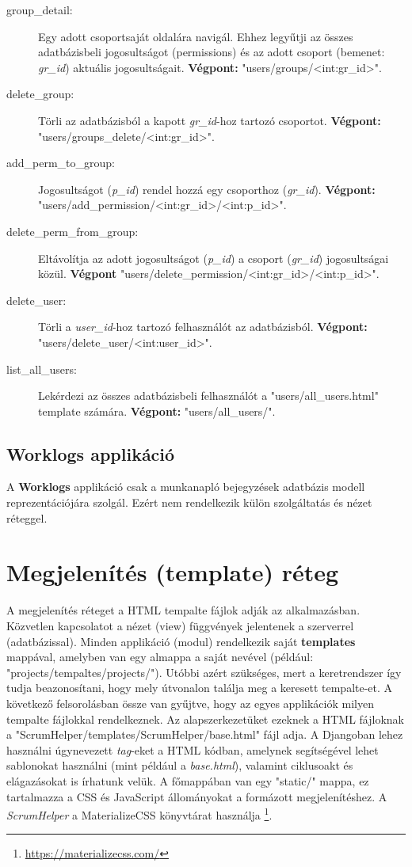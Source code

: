 \begin{itemize}
\begin{description}
		\item[group\_detail:] Egy adott csoportsaját oldalára navigál. Ehhez legyűtji az összes adatbázisbeli jogosultságot (permissions) és az adott csoport (bemenet: \textit{gr\_id}) aktuális jogosultságait. \textbf{Végpont:} "users/groups/<int:gr\_id>".
		\item[delete\_group:] Törli az adatbázisból a kapott \textit{gr\_id}-hoz tartozó csoportot. \textbf{Végpont:} "users/groups\_delete/<int:gr\_id>".
		\item[add\_perm\_to\_group:] Jogosultságot (\textit{p\_id}) rendel hozzá egy csoporthoz (\textit{gr\_id}). \textbf{Végpont:} "users/add\_permission/<int:gr\_id>/<int:p\_id>".
		\item[delete\_perm\_from\_group:] Eltávolítja az adott jogosultságot (\textit{p\_id}) a csoport (\textit{gr\_id}) jogosultságai közül. \textbf{Végpont} "users/delete\_permission/<int:gr\_id>/<int:p\_id>".
		\item[delete\_user:] Törli a \textit{user\_id}-hoz tartozó felhasználót az adatbázisból. \textbf{Végpont:} "users/delete\_user/<int:user\_id>".
		\item[list\_all\_users:] Lekérdezi az összes adatbázisbeli felhasználót a "users/all\_users.html" template számára. \textbf{Végpont:} "users/all\_users/".
	\end{description}
\end{itemize}	

\subsection{Worklogs applikáció}

A \textbf{Worklogs} applikáció csak a munkanapló bejegyzések adatbázis modell reprezentációjára szolgál. Ezért nem rendelkezik külön szolgáltatás és nézet réteggel.

\section{Megjelenítés (template) réteg}

A megjelenítés réteget a HTML tempalte fájlok adják az alkalmazásban. Közvetlen kapcsolatot a nézet (view) függvények jelentenek a szerverrel (adatbázissal). Minden applikáció (modul) rendelkezik saját \textbf{templates} mappával, amelyben van egy almappa a saját nevével (például: "projects/tempaltes/projects/"). Utóbbi azért szükséges, mert a keretrendszer így tudja beazonosítani, hogy mely útvonalon találja meg a keresett tempalte-et. A következő felsorolásban össze van gyűjtve, hogy az egyes applikációk milyen tempalte fájlokkal rendelkeznek. Az alapszerkezetüket ezeknek a HTML fájloknak a "ScrumHelper/templates/ScrumHelper/base.html" fájl adja. A Djangoban lehez használni úgynevezett \textit{tag}-eket a HTML kódban, amelynek segítségével lehet sablonokat használni (mint például a \textit{base.html}), valamint ciklusoakt és elágazásokat is írhatunk velük. A főmappában van egy "static/" mappa, ez tartalmazza a CSS és JavaScript állományokat a formázott megjelenítéshez. A \textit{ScrumHelper} a MaterializeCSS könyvtárat használja \footnote{\url{https://materializecss.com/}}.

